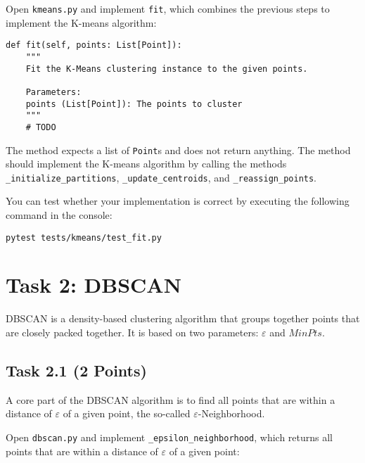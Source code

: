 \documentclass[
english,
smallborders
]{i6prcsht}
\newcommand{\points}[1]{\hfill \color{red}(#1 Points)\color{black}}
\begin{document}
Open \texttt{kmeans.py} and implement \texttt{fit}, which combines the previous steps to implement the K-means algorithm:

\vspace*{0.3cm}

\begin{lstlisting}
def fit(self, points: List[Point]):
	"""
	Fit the K-Means clustering instance to the given points.

	Parameters:
	points (List[Point]): The points to cluster
	"""
	# TODO
\end{lstlisting}

\vspace*{0.1cm}

The method expects a list of \texttt{Point}s and does not return anything. The method should implement the K-means algorithm by calling the methods \texttt{\_initialize\_partitions}, \texttt{\_update\_centroids}, and \texttt{\_reassign\_points}. 

You can test whether your implementation is correct by executing the following command in the console:

\vspace*{0.3cm}

\begin{lstlisting}
pytest tests/kmeans/test_fit.py
\end{lstlisting}

\vspace*{0.1cm}

\newpage

\section*{Task 2: DBSCAN}
\label{sec:task-two}

DBSCAN is a density-based clustering algorithm that groups together points that are closely packed together. It is based on two parameters: $\varepsilon$ and $MinPts$. 

\subsection*{Task 2.1 \points{2}}

A core part of the DBSCAN algorithm is to find all points that are within a distance of $\varepsilon$ of a given point, the so-called $\varepsilon$-Neighborhood.

Open \texttt{dbscan.py} and implement \texttt{\_epsilon\_neighborhood}, which returns all points that are within a distance of $\varepsilon$ of a given point:
\end{document}

